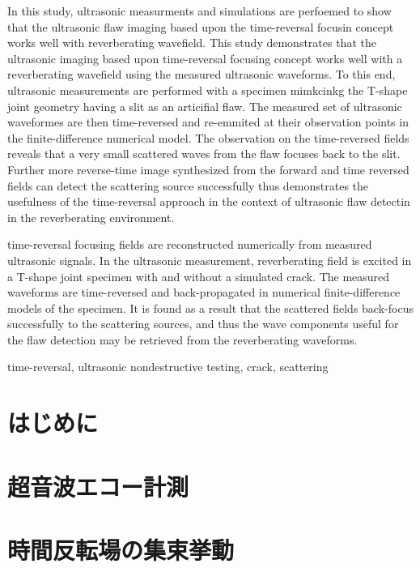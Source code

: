 \documentclass{jjsce}
\begin{document}
\begin{Eabstract}
In this study, ultrasonic measurments and simulations are perfoemed to show 
that the ultrasonic flaw imaging based upon the time-reversal focusin concept 
works well with reverberating wavefield.
 This study demonstrates that the ultrasonic imaging based upon time-reversal 
 focusing concept works well with a reverberating wavefield using the measured 
 ultrasonic waveforms. To this end, ultrasonic measurements are performed 
 with a specimen mimkcinkg the T-shape joint geometry having a slit as an articifial flaw. 
 The measured set of ultrasonic waveformes are then time-reversed and re-emmited at 
 their observation points in the finite-difference numerical model.
 The observation on the time-reversed fields reveals that a 
 very small scattered waves from the flaw focuses back to the slit. 
 Further more reverse-time image synthesized from the forward and 
 time reversed fields can detect the scattering source successfully thus 
 demonstrates the usefulness of the time-reversal approach in the context of 
 ultrasonic flaw detectin in the reverberating environment.

time-reversal focusing fields are reconstructed numerically from measured ultrasonic signals.
In the ultrasonic measurement, reverberating field is excited in a T-shape joint specimen with and without a simulated crack. 
The measured waveforms are time-reversed and back-propagated in numerical finite-difference models of the specimen.
It is found as a result that the scattered fields back-focus successfully to the scattering sources,
and thus the wave components useful for the flaw detection may be retrieved from the reverberating waveforms.
\end{Eabstract}
\begin{keyword}
time-reversal, ultrasonic nondestructive testing, crack, scattering
\end{keyword}
\maketitle
\section{はじめに}
	
\section{超音波エコー計測}
	
\section{時間反転場の集束挙動}
	
\end{document}
